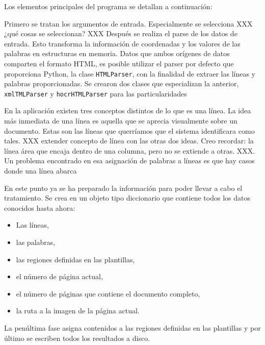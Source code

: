 Los elementos principales del programa se detallan a continuación:

Primero se tratan los argumentos de entrada. Especialmente se selecciona XXX ¿qué cosas se seleccionan? XXX
Después se realiza el parse de los datos de entrada. Esto transforma la información de coordenadas y los valores de las palabras en estructuras en memoria. Datos que ambos orígenes de datos comparten el formato HTML, es posible utilizar el parser por defecto que proporciona Python, la clase \verb|HTMLParser|, con la finalidad de extraer las líneas y palabras proporcionadas. Se crearon dos clases que especializan la anterior, \verb|xmlTMLParser| y \verb|hocrHTMLParser| para las particularidades %

En la aplicación existen tres conceptos distintos de lo que es una línea. La idea más inmediata de una línea es aquella que se aprecia visualmente sobre un documento. Estas son las líneas que querríamos que el sistema identificara como tales. XXX extender concepto de línea con las otras dos ideas. Creo recordar: la línea área que encaja dentro de una columna, pero no se extiende a otras. XXX. Un problema encontrado en esa asignación de palabras a líneas es que hay casos donde una línea abarca %

En este punto ya se ha preparado la información para poder llevar a cabo el tratamiento. Se crea en un objeto tipo diccionario que contiene todos los datos conocidos hasta ahora:

\begin{itemize}
    \item Las líneas,
    \item las palabras,
    \item las regiones definidas en las plantillas,
    \item el número de página actual,
    \item el número de páginas que contiene el documento completo,
    \item la ruta a la imagen de la página actual.
\end{itemize}

La penúltima fase asigna contenidos a las regiones definidas en las plantillas y por último se escriben todos los resultados a disco.

